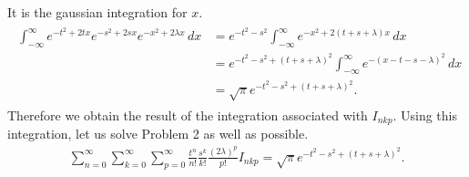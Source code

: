 \documentclass[floatfix,nofootinbib,superscriptaddress,fleqn]{revtex4-2}
\begin{document}
It is the gaussian integration for $x$.
\begin{align}\label{eq:2-7-4}
  \begin{split}
    \int^{\infty}_{-\infty}e^{-t^2+2tx}e^{-s^2+2sx}e^{-x^2+2\lambda x}\,dx
    &=e^{-t^2-s^2}\int^{\infty}_{-\infty}e^{-x^2+2(t+s+\lambda) x}\,dx \\
    &=e^{-t^2-s^2+(t+s+\lambda)^2}\int^{\infty}_{-\infty}e^{-(x-t-s-\lambda)^2}\,dx \\
    &=\sqrt{\pi}e^{-t^2-s^2+(t+s+\lambda)^2}.
  \end{split}
\end{align}
Therefore we obtain the result of the integration associated with $I_{nkp}$.
Using this integration, let us solve Problem 2 as well as possible.
\begin{align}\label{eq:2-7-5}
  \sum_{n=0}^\infty\sum_{k=0}^\infty\sum_{p=0}^{\infty}
  \frac{t^n}{n!}\frac{s^k}{k!}\frac{(2\lambda)^p}{p!}
  I_{nkp}
  =\sqrt{\pi}e^{-t^2-s^2+(t+s+\lambda)^2}.
\end{align}
\end{document}
